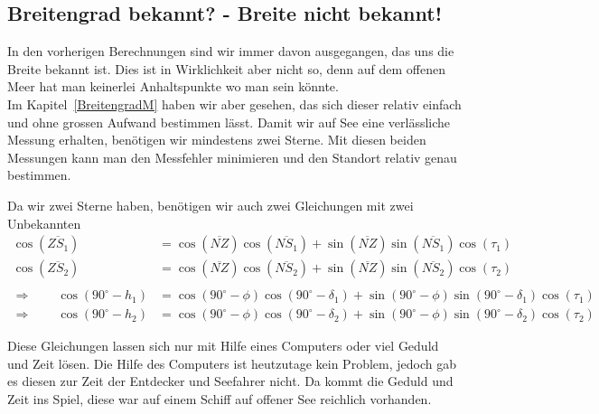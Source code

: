 \begin{refsection}
\subsection{Breitengrad bekannt? - Breite nicht bekannt!}
In den vorherigen Berechnungen sind wir immer davon ausgegangen, das uns die Breite bekannt ist. Dies ist in Wirklichkeit aber nicht so, denn auf dem offenen Meer hat man keinerlei Anhaltspunkte wo man sein könnte. \\
Im Kapitel~\ref{BreitengradM}  haben wir aber gesehen, das sich dieser relativ einfach und ohne grossen Aufwand bestimmen lässt. Damit wir auf See eine verlässliche Messung erhalten, benötigen wir mindestens zwei Sterne. Mit diesen beiden Messungen kann man den Messfehler minimieren und den Standort relativ genau bestimmen.

Da wir zwei Sterne haben, benötigen wir auch zwei Gleichungen mit zwei Unbekannten
\begin{align*}
\cos(\overline{ZS_1}) &= \cos(\overline{NZ}) \cos(\overline{NS_1}) + \sin(\overline{NZ}) \sin(\overline{NS_1}) \cos(\tau_1) \\
\cos(\overline{ZS_2}) &= \cos(\overline{NZ}) \cos(\overline{NS_2}) + \sin(\overline{NZ}) \sin(\overline{NS_2}) \cos(\tau_2) \\
\\
\Rightarrow \quad \quad
\cos(90^{\circ} - h_1) &= \cos(90^{\circ} - \phi) \cos(90^{\circ} - \delta_1) + \sin(90^{\circ} - \phi)\sin(90^{\circ} - \delta_1) \cos(\tau_1) \\
\Rightarrow \quad \quad
\cos(90^{\circ} - h_2) &= \cos(90^{\circ} - \phi) \cos(90^{\circ} - \delta_2) + \sin(90^{\circ} - \phi)\sin(90^{\circ} - \delta_2) \cos(\tau_2)
\end{align*}

Diese Gleichungen lassen sich nur mit Hilfe eines Computers oder viel Geduld und Zeit lösen. Die Hilfe des Computers ist heutzutage kein Problem, jedoch gab es diesen zur Zeit der Entdecker und Seefahrer nicht. Da kommt die Geduld und Zeit ins Spiel, diese war auf einem Schiff auf offener See reichlich vorhanden.





\printbibliography[heading=subbibliography]
\end{refsection}



